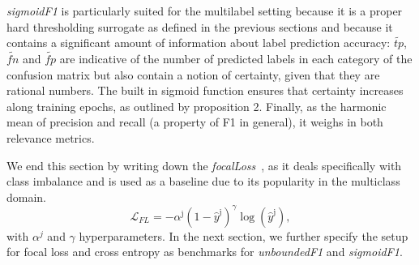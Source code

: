 \emph{sigmoidF1} is particularly suited for the multilabel setting because it is a proper hard thresholding surrogate as defined in the previous sections and because it contains a significant amount of information about label prediction accuracy: $\widetilde{\mathit{tp}}$, $\widetilde{\mathit{fn}}$ and $\widetilde{\mathit{fp}}$ are indicative of the number of predicted labels in each category of the confusion matrix but also contain a notion of certainty, given that they are rational numbers. The built in sigmoid function ensures that certainty increases along training epochs, as outlined by proposition 2. Finally, as the harmonic mean of precision and recall (a property of F1 in general), it weighs in both relevance metrics.

\vspace{\baselineskip}

We end this section by writing down the \emph{focalLoss}~\cite{focalLoss}, as it deals specifically with class imbalance and is used as a baseline due to its popularity in the multiclass domain.
%
\begin{equation}
  \mathcal{L}_{FL} = -\alpha^{\mathrm{j}}\left(1-\hat{y}^{\mathrm{j}}\right)^{\gamma} \log \left(\hat{y}^{\mathrm{j}}\right),
\end{equation}
%
with $\alpha^j$ and $\gamma$ hyperparameters. In the next section, we further specify the setup for focal loss and cross entropy as benchmarks for \emph{unboundedF1} and \emph{sigmoidF1}.










